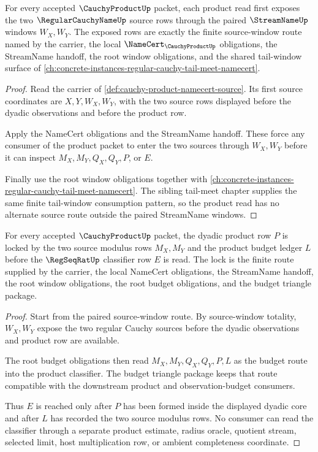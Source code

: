\begin{theorem}
\label{thm:cauchy-product-root-source-window-totality}
For every accepted $\CauchyProductUp$ packet, each product read first exposes the two $\RegularCauchyNameUp$ source rows through the paired $\StreamNameUp$ windows $W_X,W_Y$. The exposed rows are exactly the finite source-window route named by the carrier, the local $\NameCert_{\CauchyProductUp}$ obligations, the StreamName handoff, the root window obligations, and the shared tail-window surface of \autoref{ch:concrete-instances-regular-cauchy-tail-meet-namecert}.
\end{theorem}
\begin{proof}
Read the carrier of \autoref{def:cauchy-product-namecert-source}. Its first source coordinates are $X,Y,W_X,W_Y$, with the two source rows displayed before the dyadic observations and before the product row.

Apply the NameCert obligations and the StreamName handoff. These force any consumer of the product packet to enter the two sources through $W_X,W_Y$ before it can inspect $M_X,M_Y,Q_X,Q_Y,P$, or $E$.

Finally use the root window obligations together with \autoref{ch:concrete-instances-regular-cauchy-tail-meet-namecert}. The sibling tail-meet chapter supplies the same finite tail-window consumption pattern, so the product read has no alternate source route outside the paired StreamName windows.
\end{proof}

\begin{theorem}
\label{thm:cauchy-product-root-budget-product-lock}
For every accepted $\CauchyProductUp$ packet, the dyadic product row $P$ is locked by the two source modulus rows $M_X,M_Y$ and the product budget ledger $L$ before the $\RegSeqRatUp$ classifier row $E$ is read. The lock is the finite route supplied by the carrier, the local NameCert obligations, the StreamName handoff, the root window obligations, the root budget obligations, and the budget triangle package.
\end{theorem}
\begin{proof}
Start from the paired source-window route. By source-window totality, $W_X,W_Y$ expose the two regular Cauchy sources before the dyadic observations and product row are available.

The root budget obligations then read $M_X,M_Y,Q_X,Q_Y,P,L$ as the budget route into the product classifier. The budget triangle package keeps that route compatible with the downstream product and observation-budget consumers.

Thus $E$ is reached only after $P$ has been formed inside the displayed dyadic core and after $L$ has recorded the two source modulus rows. No consumer can read the classifier through a separate product estimate, radius oracle, quotient stream, selected limit, host multiplication row, or ambient completeness coordinate.
\end{proof}

